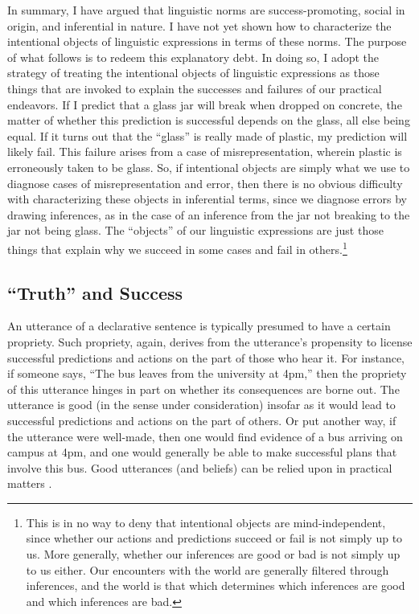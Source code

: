 In summary, I have argued that linguistic norms are success-promoting, social in origin, and inferential in nature. I have not yet shown how to characterize the intentional objects of linguistic expressions in terms of these norms. The purpose of what follows is to redeem this explanatory debt. In doing so, I adopt the strategy of treating the intentional objects of linguistic expressions as those things that are invoked to explain the successes and failures of our practical endeavors. If I predict that a glass jar will break when dropped on concrete, the matter of whether this prediction is successful depends on the glass, all else being equal. If it turns out that the ``glass'' is really made of plastic, my prediction will likely fail. This failure arises from a case of misrepresentation, wherein plastic is erroneously taken to be glass. So, if intentional objects are simply what we use to diagnose cases of misrepresentation and error, then there is no obvious difficulty with characterizing these objects in inferential terms, since we diagnose errors by drawing inferences, as in the case of an inference from the jar not breaking to the jar not being glass. The ``objects'' of our linguistic expressions are just those things that explain why we succeed in some cases and fail in others.\footnote{This is in no way to deny that intentional objects are mind-independent, since whether our actions and predictions succeed or fail is not simply up to us. More generally, whether our inferences are good or bad is not simply up to us either. Our encounters with the world are generally filtered through inferences, and the world is that which determines which inferences are good and which inferences are bad.} 
 
\subsection{``Truth'' and Success}

An utterance of a declarative sentence is typically presumed to have a certain propriety. Such propriety, again, derives from the utterance's propensity to license successful predictions and actions on the part of those who hear it. For instance, if someone says, ``The bus leaves from the university at 4pm,'' then the propriety of this utterance hinges in part on whether its consequences are borne out. The utterance is good (in the sense under consideration) insofar as it would lead to successful predictions and actions on the part of others. Or put another way, if the utterance were well-made, then one would find evidence of a bus arriving on campus at 4pm, and one would generally be able to make successful plans that involve this bus. Good utterances (and beliefs) can be relied upon in practical matters \citep{Misak:2007}. 

